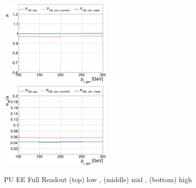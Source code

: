 \begin{figure}
\includegraphics[width=0.495\textwidth]{./plots_pdf/ECAL_plots/plotsPU/EE/FULL/pdf/GENPT/EEFULL_GENPT_0100_0300_MuOverBins.pdf}
\includegraphics[width=0.495\textwidth]{./plots_pdf/ECAL_plots/plotsPU/EE/FULL/pdf/GENPT/EEFULL_GENPT_0100_0300_EffSigmaOverBins.pdf}

\caption [Energy response of PF ECAL cluster vs \pt for PU EE Full readout senario]{PU EE Full Readout (top) low \pt, (middle) mid \pt, (bottom) high \pt}
\label{fig:PU_EEFULL_pt}
\end{figure}


